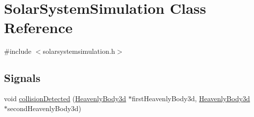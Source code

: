 \hypertarget{classSolarSystemSimulation}{
\section{\-Solar\-System\-Simulation \-Class \-Reference}
\label{d7/d64/classSolarSystemSimulation}
}


{\ttfamily \#include $<$solarsystemsimulation.\-h$>$}

\subsection*{\-Signals}
\begin{DoxyCompactItemize}
\item 
void \hyperlink{classSolarSystemSimulation_ada4e418772aaed030ee746611fa44df1}{collision\-Detected} (\hyperlink{classHeavenlyBody3d}{\-Heavenly\-Body3d} $\ast$first\-Heavenly\-Body3d, \hyperlink{classHeavenlyBody3d}{\-Heavenly\-Body3d} $\ast$second\-Heavenly\-Body3d)
\end{DoxyCompactItemize}
